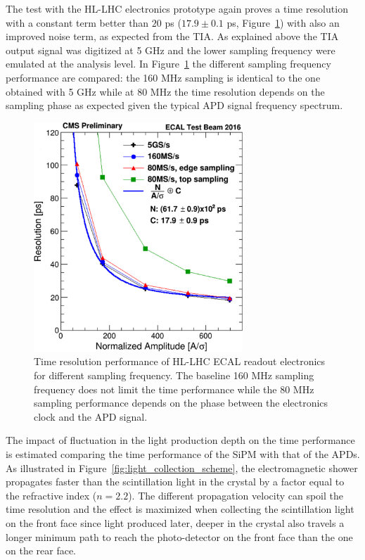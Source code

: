 The test with the HL-LHC electronics prototype again proves a time resolution with a constant term
better than $20$ ps ($17.9\pm 0.1$ ps, Figure~\ref{fig:tia_tres}) with also an improved noise term, as expected
from the TIA.
As explained above the TIA output signal was digitized at 5 GHz and the lower sampling frequency were emulated at the
analysis level. In Figure~\ref{fig:tia_tres} the different sampling frequency performance are compared:
the 160 MHz sampling is identical to the one obtained with 5 GHz while at 80 MHz the time resolution
depends on the sampling phase as expected given the typical APD signal frequency spectrum. 

\begin{figure}[h!]
  \centering
  \includegraphics[width = 0.7\textwidth]{figures/upgrade/sampling_freq_res_comp.png}
  \caption{Time resolution performance of HL-LHC ECAL readout electronics for different sampling frequency.
    The baseline 160 MHz sampling frequency does not limit the time performance while the 80 MHz sampling
    performance depends on the phase between the electronics clock and the APD signal.}
  \label{fig:tia_tres}
\end{figure}

The impact of fluctuation in the light production depth on the time performance is estimated comparing the
time performance of the SiPM with that of the APDs. As illustrated in Figure~\ref{fig:light_collection_scheme}, 
the electromagnetic shower propagates faster than the scintillation light in the crystal by a factor equal
to the \PbWO refractive index ($n=2.2$). The different propagation velocity can spoil the time resolution and the
effect is maximized when collecting the scintillation light on the front face since light produced later, deeper in
the crystal also travels a longer minimum path to reach the photo-detector on the front face than the one on the rear face.


